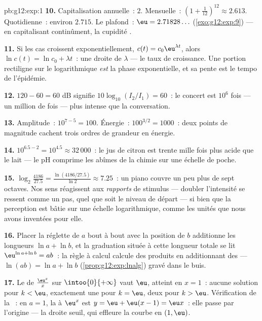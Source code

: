 \begin{solution}{pb:g12:exp:1}
\textbf{10.} Capitalisation annuelle~: $2$. Mensuelle~:
$\left(1 + \frac{1}{12}\right)^{12} \approx 2.613$. Quotidienne~:
environ $2.715$. Le plafond~: $\eu = 2.71828\ldots$
(\cref{exo:g12:exp:9}) --- en capitalisant continûment, la
cupidité .

\textbf{11.} Si les cas croissent exponentiellement,
$c(t) = c_0 \eu^{\lambda t}$, alors
$\ln c(t) = \ln c_0 + \lambda t$~: une droite de  $\lambda$ --- le taux de croissance. Une portion
rectiligne sur le  logarithmique \emph{est} la phase
exponentielle, et sa pente est le tempo de l'épidémie.

\textbf{12.} $120 - 60 = 60$ dB signifie
$10\log_{10}(I_2/I_1) = 60$~: le concert est $10^6$ fois --- un
million de fois --- plus intense que la conversation.

\textbf{13.} Amplitude~: $10^{7-5} = 100$. Énergie~:
$100^{3/2} = 1000$~: deux points de magnitude cachent trois ordres
de grandeur en énergie.

\textbf{14.} $10^{6.5 - 2} = 10^{4.5} \approx 32\,000$~: le jus de
citron est trente mille fois plus acide que le lait --- le pH
comprime les abîmes de la chimie sur une échelle de poche.

\textbf{15.} $\log_2\!\frac{4186}{27.5} =
\frac{\ln(4186/27.5)}{\ln 2} \approx 7.25$~: un piano couvre un peu
plus de sept octaves. Nos sens réagissent aux \emph{rapports} de
stimulus --- doubler l'intensité se ressent comme un pas, quel que
soit le niveau de départ --- si bien que la perception est bâtie sur
une échelle logarithmique, comme les unités que nous avons inventées
pour elle.

\textbf{16.} Placer la réglette de $a$ bout à bout avec la position
de $b$ additionne les longueurs $\ln a + \ln b$, et la graduation
située à cette longueur totale se lit
$\eu^{\ln a + \ln b} = ab$~: la règle à calcul calcule des produits
en additionnant des  --- $\ln(ab) = \ln a + \ln b$
(\cref{prop:g12:exp:lnalg}) gravé dans le buis.

\textbf{17.} Le  de $\frac{\eu^x}{x}$ sur
$\intoo{0}{+\infty}$ vaut $\eu$, atteint en $x = 1$~: aucune
solution pour $k < \eu$, exactement une pour $k = \eu$, deux pour
$k > \eu$. Vérification de la ~: en $a = 1$, la  à
$\eu^x$ est $y = \eu + \eu(x - 1) = \eu x$~: elle passe par
l'origine --- la droite seuil, qui effleure la courbe en
$(1, \eu)$.


\end{solution}
